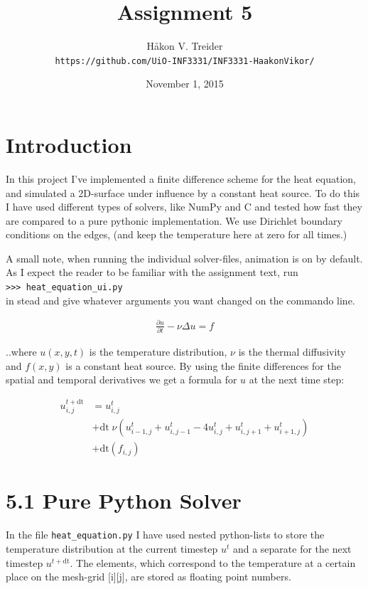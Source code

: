 \documentclass[a4paper]{article}
\title{Assignment 5}
\author{Håkon V. Treider\\\texttt{https://github.com/UiO-INF3331/INF3331-HaakonVikor/}}
\date{November 1, 2015}
\begin{document}
\maketitle

\section*{Introduction}

In this project I've implemented a finite difference scheme for the heat equation, and simulated a 2D-surface under influence by a constant heat source. To do this I have used different types of solvers, like NumPy and C and tested how fast they are compared to a pure pythonic implementation. We use Dirichlet boundary conditions on the edges, (and keep the temperature here at zero for all times.)

A small note, when running the individual solver-files, animation is on by default. As I expect the reader to be familiar with the assignment text, run\\
\texttt{>>> heat\_equation\_ui.py}\\
in stead and give whatever arguments you want changed on the commando line.

\begin{align}
\label{EQ:heat}
\frac{\partial u}{\partial t} - \nu\Delta u = f 
\end{align}

..where $u(x,y,t)$ is the temperature distribution, $\nu$ is the thermal diffusivity and $f(x,y)$ is a constant heat source. By using the finite differences for the spatial and temporal derivatives we get a formula for $u$ at the next time step:

\begin{align}
\label{EQ:upd_formula}
u^{t+\text{dt}}_{i,j} &= u^{t}_{i,j}\\
& + \text{dt}\;\nu\left(u^{t}_{i-1,j} + u^{t}_{i,j-1} - 4u^{t}_{i,j} + u^{t}_{i,j+1} + u^{t}_{i+1,j}\right)\nonumber\\
& + \text{dt}\left(f_{i,j}\right)\nonumber
\end{align}

\section*{5.1 Pure Python Solver}
In the file \texttt{heat\_equation.py} I have used nested python-lists to store the temperature distribution at the current timestep $u^t$ and a separate for the next timestep $u^{t+\text{dt}}$. The elements, which correspond to the temperature at a certain place on the mesh-grid [i][j], are stored as floating point numbers.
\newline
\end{document}
